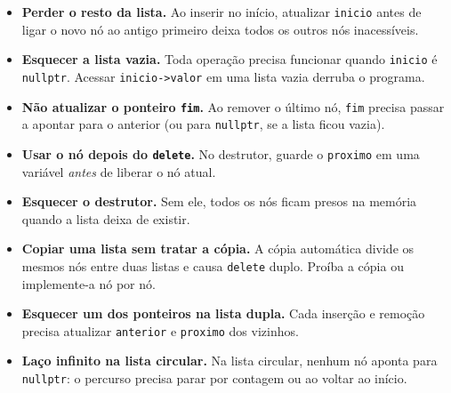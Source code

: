 \begin{itemize}
  \item \textbf{Perder o resto da lista.} Ao inserir no início, atualizar \texttt{inicio} antes de ligar o novo nó ao antigo primeiro deixa todos os outros nós inacessíveis.
  \item \textbf{Esquecer a lista vazia.} Toda operação precisa funcionar quando \texttt{inicio} é \texttt{nullptr}. Acessar \texttt{inicio->valor} em uma lista vazia derruba o programa.
  \item \textbf{Não atualizar o ponteiro \texttt{fim}.} Ao remover o último nó, \texttt{fim} precisa passar a apontar para o anterior (ou para \texttt{nullptr}, se a lista ficou vazia).
  \item \textbf{Usar o nó depois do \texttt{delete}.} No destrutor, guarde o \texttt{proximo} em uma variável \textit{antes} de liberar o nó atual.
  \item \textbf{Esquecer o destrutor.} Sem ele, todos os nós ficam presos na memória quando a lista deixa de existir.
  \item \textbf{Copiar uma lista sem tratar a cópia.} A cópia automática divide os mesmos nós entre duas listas e causa \texttt{delete} duplo. Proíba a cópia ou implemente-a nó por nó.
  \item \textbf{Esquecer um dos ponteiros na lista dupla.} Cada inserção e remoção precisa atualizar \texttt{anterior} e \texttt{proximo} dos vizinhos.
  \item \textbf{Laço infinito na lista circular.} Na lista circular, nenhum nó aponta para \texttt{nullptr}: o percurso precisa parar por contagem ou ao voltar ao início.
\end{itemize}
